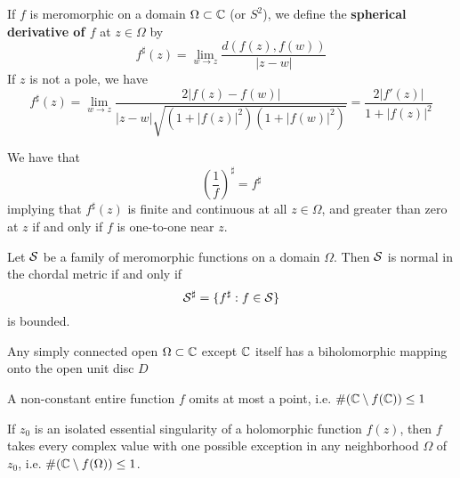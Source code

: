 \documentclass{article}
\begin{document}
\begin{definition}
  If \(f\) is meromorphic on a domain \(\Omega \subset \mathbb{C}\) (or \(S^2\)), we define the \textbf{spherical derivative of \(f\)} at \(z \in \Omega\) by
  \begin{equation}
    f^\sharp(z) = \lim_{w \to z}\frac{d(f(z), f(w))}{|z - w|}
  \end{equation}
  If \(z\) is not a pole, we have
  \begin{equation}
    f^\sharp(z)
    = \lim_{w \to z}
      \frac{2|f(z) - f(w)|}{|z - w|\sqrt{(1 + |f(z)|^2)(1 + |f(w)|^2)}}
    = \frac{2|f'(z)|}{1 + |f(z)|^2}
  \end{equation}
\end{definition}

We have that
  \begin{equation}\left(\frac{1}{f}\right)^\sharp = f^\sharp\end{equation}
  implying that \(f^\sharp(z)\) is finite and continuous at all \(z \in \Omega\), and greater than zero at \(z\) if and only if \(f\) is one-to-one near \(z\).
  \begin{theorem}
  Let \(\mathcal{S}\) be a family of meromorphic functions on a domain \(\Omega\). Then \(\mathcal{S}\) is normal in the chordal metric if and only if
  \begin{equation}\mathcal{S}^\sharp = \{f^\sharp : f \in \mathcal{S}\}\end{equation}
  is bounded.
\end{theorem}

\begin{theorem}
  Any simply connected open \(\Omega \subset \mathbb{C}\) except \(\mathbb{C}\) itself has a biholomorphic mapping onto the open unit disc \(D\)
\end{theorem}

\begin{theorem}
A non-constant entire function \(f\) omits at most a point, i.e. \(\#(\mathbb{C}\setminus f(\mathbb{C})) \leq 1\)
\end{theorem}

\begin{theorem}
  If \(z_0\) is an isolated essential singularity of a holomorphic function \(f(z)\), then \(f\) takes every complex value with one possible exception in any neighborhood \(\Omega\) of \(z_0\), i.e. \(\#(\mathbb{C}\setminus f(\Omega)) \leq 1\).
  \label{theorem:big_picard}
\end{theorem}
\end{document}

